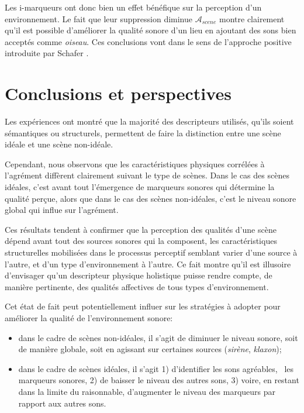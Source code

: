 \documentclass[twoside,twocolumn]{article}
\begin{document}
Les i-marqueurs ont donc bien un effet bénéfique sur la perception d'un environnement. Le fait que leur suppression diminue $\mathcal{A}_{scene}$ montre clairement qu'il est possible d'améliorer la qualité sonore d'un lieu en ajoutant des sons bien acceptés comme \emph{oiseau}. Ces conclusions vont dans le sens de l'approche positive introduite par Schafer \cite{schafer1977tuning}.




\section{Conclusions et perspectives}

Les expériences ont montré que la majorité des descripteurs utilisés, qu'ils soient sémantiques ou structurels, permettent de faire la distinction entre une scène idéale et une scène non-idéale.

Cependant, nous observons que les caractéristiques physiques corrélées à l'agrément diffèrent clairement suivant le type de scènes. Dans le cas des scènes idéales, c'est avant tout l'émergence de marqueurs sonores qui détermine la qualité perçue, alors que dans le cas des scènes non-idéales, c'est le niveau sonore global qui influe sur l'agrément.

Ces résultats tendent à confirmer que la perception des qualités d'une scène dépend avant tout des sources sonores qui la composent, les caractéristiques structurelles mobilisées dans le processus perceptif semblant varier d'une source à l'autre, et d'un type d'environnement à l'autre. Ce fait montre qu'il est illusoire d'envisager qu'un descripteur physique holistique puisse rendre compte, de manière pertinente, des qualités affectives de tous types d'environnement.

Cet état de fait peut potentiellement influer sur les stratégies à adopter pour améliorer la qualité de l’environnement sonore:

\begin{itemize}
\item dans le cadre de scènes non-idéales, il s'agit de diminuer le niveau sonore, soit de manière globale, soit en agissant sur certaines sources (\emph{sirène}, \emph{klaxon});
\item dans le cadre de scènes idéales, il s'agit 1) d'identifier les sons agréables, \ie~les marqueurs sonores, 2) de baisser le niveau des autres sons, 3) voire, en restant dans la limite du raisonnable, d'augmenter le niveau des marqueurs par rapport aux autres sons.
\end{itemize}
\end{document}
